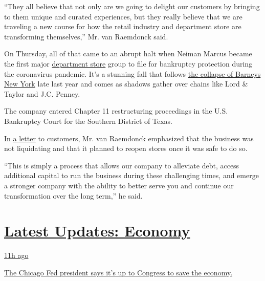 ``They all believe that not only are we going to delight our customers
by bringing to them unique and curated experiences, but they really
believe that we are traveling a new course for how the retail industry
and department store are transforming themselves,'' Mr. van Raemdonck
said.

On Thursday, all of that came to an abrupt halt when Neiman Marcus
became the first major
\href{https://www.nytimes3xbfgragh.onion/2020/04/21/business/coronavirus-department-stores-neiman-marcus.html?searchResultPosition=3}{department
store} group to file for bankruptcy protection during the coronavirus
pandemic. It's a stunning fall that follows
\href{https://www.nytimes3xbfgragh.onion/2019/11/01/business/barneys-bankruptcy-authentic-brands.html}{the
collapse of Barneys New York} late last year and comes as shadows gather
over chains like Lord \& Taylor and J.C. Penney.

The company entered Chapter 11 restructuring proceedings in the U.S.
Bankruptcy Court for the Southern District of Texas.

In
\href{https://cases.stretto.com/public/X064/10214/faqs/b25e205c-4fd0-4695-937b-c41e9aad0866.pdf}{a
letter} to customers, Mr. van Raemdonck emphasized that the business was
not liquidating and that it planned to reopen stores once it was safe to
do so.

``This is simply a process that allows our company to alleviate debt,
access additional capital to run the business during these challenging
times, and emerge a stronger company with the ability to better serve
you and continue our transformation over the long term,'' he said.

\hypertarget{latest-updates-economy}{%
\section{\texorpdfstring{\href{https://www.nytimes3xbfgragh.onion/live/2020/08/03/business/stock-market-today-coronavirus?action=click\&pgtype=Article\&state=default\&region=MAIN_CONTENT_1\&context=storylines_live_updates}{Latest
Updates:
Economy}}{Latest Updates: Economy}}\label{latest-updates-economy}}

\href{https://www.nytimes3xbfgragh.onion/live/2020/08/03/business/stock-market-today-coronavirus?action=click\&pgtype=Article\&state=default\&region=MAIN_CONTENT_1\&context=storylines_live_updates\#the-chicago-fed-president-says-its-up-to-congress-to-save-the-economy}{11h
ago}

\href{https://www.nytimes3xbfgragh.onion/live/2020/08/03/business/stock-market-today-coronavirus?action=click\&pgtype=Article\&state=default\&region=MAIN_CONTENT_1\&context=storylines_live_updates\#the-chicago-fed-president-says-its-up-to-congress-to-save-the-economy}{The
Chicago Fed president says it's up to Congress to save the economy.}


